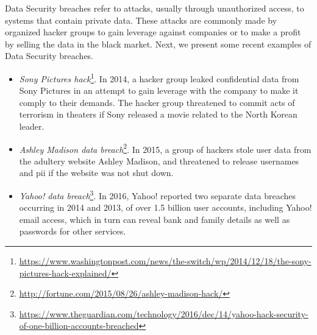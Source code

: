 Data Security breaches refer to attacks, usually through unauthorized access, to systems that contain private data. These attacks are commonly made by organized hacker groups to gain leverage against companies or to make a profit by selling the data in the black market. Next, we present some recent examples of Data Security breaches.
\begin{itemize}

    \item \textit{Sony Pictures hack}\footnote{\url{https://www.washingtonpost.com/news/the-switch/wp/2014/12/18/the-sony-pictures-hack-explained/}}. In 2014, a hacker group leaked confidential data from Sony Pictures in an attempt to gain leverage with the company to make it comply to their demands. The hacker group threatened to commit acts of terrorism in theaters if Sony released a movie related to the North Korean leader.


    \item \textit{Ashley Madison data breach}\footnote{\url{http://fortune.com/2015/08/26/ashley-madison-hack/}}. In 2015, a group of hackers stole user data from the adultery website Ashley Madison, and threatened to release usernames and \ac{pii} if the website was not shut down.

    \item \textit{Yahoo! data breach}\footnote{\url{https://www.theguardian.com/technology/2016/dec/14/yahoo-hack-security-of-one-billion-accounts-breached}}. In 2016, Yahoo! reported two separate data breaches occurring in 2014 and 2013, of over 1.5 billion user accounts, including Yahoo! email access, which in turn can reveal bank and family details as well as passwords for other services.


\end{itemize}




